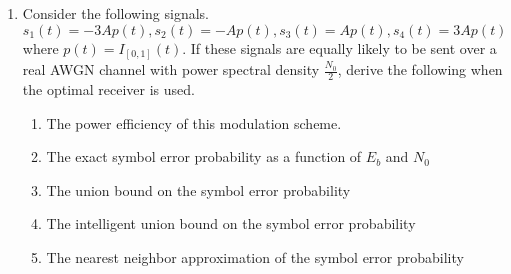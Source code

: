 \documentclass[10pt]{report}
\begin{document}
\begin{enumerate}
 \item Consider the following signals. 
    \begin{equation*}
      s_1(t) = -3A p(t), s_2(t) = -A p(t), s_3(t) = A p(t), s_4(t) = 3A p(t)
    \end{equation*}
    where $p(t) = I_{[0,1]}(t)$.
  If these signals are equally likely to be sent over a real AWGN channel with power spectral density $\frac{N_0}{2}$,  derive the following when the optimal receiver is used.
  \begin{enumerate}
    \item The power efficiency of this modulation scheme.
    \item The exact symbol error probability as a function of $E_b$ and $N_0$
    \item The union bound on the symbol error probability
    \item The intelligent union bound on the symbol error probability
    \item The nearest neighbor approximation of the symbol error probability
  \end{enumerate}


\end{enumerate}
\end{document}
